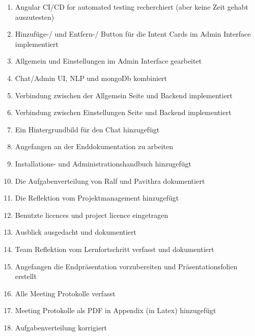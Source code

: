 \begin{enumerate}
    \item Angular CI/CD for automated testing recherchiert (aber keine Zeit gehabt auszutesten)
    \item Hinzufüge-/ und Entfern-/ Button für die Intent Cards im Admin Interface implementiert
    \item Allgemein und Einstellungen im Admin Interface gearbeitet
    \item Chat/Admin UI, NLP und mongoDb kombiniert
    \item Verbindung zwischen der Allgemein Seite und Backend implementiert
    \item Verbindung zwischen Einstellungen Seite und Backend implementiert
    \item Ein Hintergrundbild für den Chat hinzugefügt
    \item Angefangen an der Enddokumentation zu arbeiten
    \item Installations- und Administrationshandbuch hinzugefügt
    \item Die Aufgabenverteilung von Ralf und Pavithra dokumentiert
    \item Die Reflektion vom Projektmanagement hinzugefügt
    \item Benutzte licences und project licence eingetragen
    \item Ausblick ausgedacht und dokumentiert
    \item Team Reflektion vom Lernfortschritt verfasst und dokumentiert
    \item Angefangen die Endpräsentation vorzubereiten und Präsentationsfolien erstellt
    \item Alle Meeting Protokolle verfasst
    \item Meeting Protokolle als PDF in Appendix (in Latex) hinzugefügt
    \item Aufgabenverteilung korrigiert
\end{enumerate}